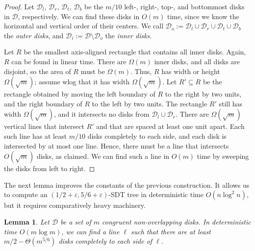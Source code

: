 \documentclass{paper}
\newcommand {\eps} {\varepsilon}
\newcommand {\eqdef}{:=}
\newcommand {\script} [1] {\ensuremath {\mathcal {#1}}}
\newcommand {\D} {\script {D}}
\newtheorem{lemma}[theorem]{Lemma}
\begin{document}
\begin{proof}
Let $\D_l$, $\D_r$, $\D_t$, $\D_b$ be the $m/10$ left-, right-,
top-, and bottommost disks in $\D$, respectively.
We can find these disks in $O(m)$ time, since we know the horizontal
and vertical order of their centers. We call 
$\D_o \eqdef \D_l \cup \D_r \cup \D_t \cup \D_b$ the \emph{outer disks}, and
$\D_i \eqdef \D \setminus \D_o$ the \emph{inner disks}.

Let $R$ be the smallest axis-aligned rectangle that contains
all inner disks. Again, $R$ can be found in linear time. 
There are $\Omega(m)$ inner disks, and all
disks are disjoint, so the area of $R$ must be $\Omega(m)$.
Thus, $R$ has width or height $\Omega(\sqrt{m})$; assume 
wlog that it has width $\Omega(\sqrt{m})$. Let $R' \subseteq R$ be
the rectangle obtained by moving the left boundary of $R$ to the right
by two units, and the right boundary of $R$ to the left by two units.
The rectangle $R'$ still has width $\Omega(\sqrt{m})$, and it intersects
no disks from $\D_l \cup \D_r$.
There are $\Omega(\sqrt{m})$ vertical lines that intersect
$R'$ and that are spaced at least one unit apart.
Each such line has at least $m/10$ disks completely to each side, and
each disk is intersected by at most one line. 
Hence, there must be a line that intersects $O(\sqrt{m})$ disks, as claimed.
We can find such a line in $O(m)$ time by sweeping the disks from
left to right.
\end{proof}


The next lemma improves the constants of the previous construction. It
allows us to compute an $(1/2 + \eps, 5/6 + \eps)$-SDT
tree in deterministic time $O(n \log^2 n)$, but it requires comparatively heavy machinery.
\begin{lemma}\label{lem:sdt_matousek}
Let $\D$ be a set of $m$ congruent non-overlapping disks.
In deterministic time $O(m \log m)$, we can find a line $\ell$ such
that there are at least $m/2 - \Theta(m^{5/6})$ disks completely to each side
of $\ell$.
\end{lemma}
\end{document}
